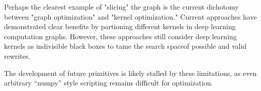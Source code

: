 Perhaps the clearest example of "slicing" the graph is the current dichotomy between "graph optimization" and "kernel optimization."
Current approaches have demonstrated clear benefits by partioning different kernels in deep learning computation graphs.
However, these approaches still consider deep learning kernels as indivisible black boxes to tame the search spaceof possible and valid rewrites.

The development of future primitives is likely stalled by these limitations, as even arbitrary ``numpy'' style scripting remains difficult for optimization.

